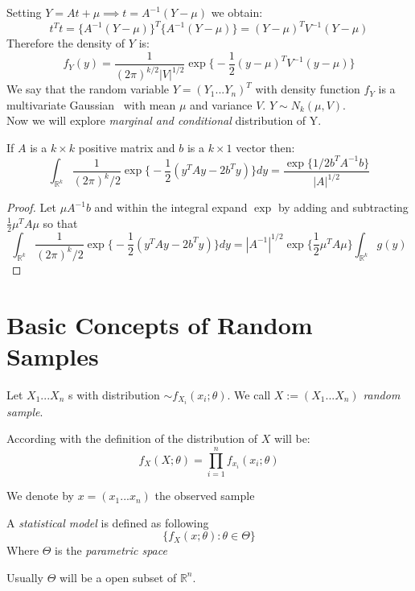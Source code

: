 Setting $Y=At+\mu \implies t=A^{-1} (Y- \mu)$ we obtain:
$$t^Tt=\{ A^{-1} (Y- \mu) \}^T \{ A^{-1}(Y-\mu) \}=(Y-\mu)^T V^{-1}(Y-\mu)$$
Therefore the density of $Y$ is:
$$f_Y(y)=\frac{1}{(2\pi)^{k/2}|V|^{1/2}}\exp \bigg\{ -\frac{1}{2}(y-\mu)^T V^{-1} (y-\mu) \bigg\} $$
We say that the random variable $Y=(Y_1...Y_n)^T$ with density function $f_Y$ is a multivariate Gaussian \rv \ with mean $\mu$ and variance $V$. $Y\sim N_k(\mu,V)$.\\

Now we will explore \textit{marginal and conditional} distribution of Y.\\
\begin{prop}
	If $A$ is a $k\times k$  positive matrix and $b$ is a $k\times 1$ vector then:
	\[
	\int_{\mathbb{R}^k} \frac{1}{(2\pi)^k/2} \exp\bigg\{ - \frac{1}{2} (y^TAy - 2 b^T y )\bigg\} dy = \frac{\exp \{ 1/2 b^TA^{-1} b \} }{|A|^{1/2}}
\]
\end{prop}
\begin{proof}
	Let $\mu A^{-1}b$ and within the integral expand $\exp{}$ by adding and subtracting  $\frac{1}{2}\mu^TA\mu$ so that
	$$\int_{\mathbb{R}^k} \frac{1}{(2\pi)^k/2} \exp\bigg\{ - \frac{1}{2} (y^TAy - 2 b^T y )\bigg\} dy=|A^{-1}|^{1/2}\exp \bigg\{ \frac{1}{2} \mu^TA\mu \bigg\} \int_{\mathbb{R}^k}g(y)$$
\end{proof}

\section{Basic Concepts of Random Samples}

\begin{defi}
	Let $X_1...X_n$ \iid   \rv s with distribution $\sim f_{X_i}(x_i; \theta)$. We call $X:=(X_1...X_n)	$ \textit{random sample}.
\end{defi}
According with the definition of \rs the distribution of $X$ will be:
$$f_X(X;\theta)= \prod_{i=1}^{n}f_{x_i}(x_i;\theta)$$
\begin{defi}
	We denote by $x=(x_1...x_n)$ the observed sample
\end{defi}

\begin{defi}
	A \textit{statistical model} is defined as following
	$$\{ f_{X}(x;\theta) : \theta \in \Theta \}$$
	Where $\Theta $ is the \textit{parametric space}
\end{defi}
Usually $\Theta$ will be a open subset of $\mathbb{R}^n$.\\


